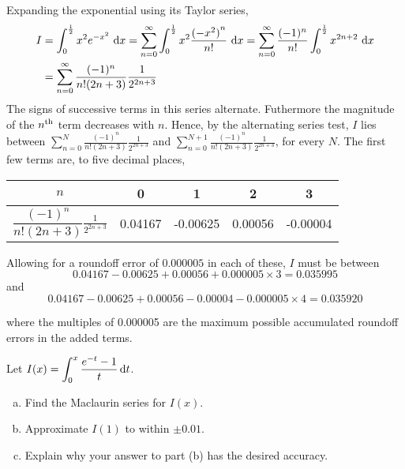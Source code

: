 \begin{solution}
Expanding the exponential using its Taylor series,
\begin{align*}
I&=\int_0^{\frac{1}{2}} x^2 e^{-x^2}\ \dee{x}
=\sum_{n=0}^\infty\int_0^{\frac{1}{2}} x^2 \frac{{(-x^2)}^n}{n!}\ \dee{x}
=\sum_{n=0}^\infty \frac{(-1)^n}{n!}\int_0^{\frac{1}{2}} x^{2n+2} \ \dee{x} \\
&=\sum_{n=0}^\infty \frac{(-1)^n}{n!(2n+3)}\frac{1}{2^{2n+3}}
\end{align*}
The signs of successive terms in this series alternate. Futhermore the
magnitude of the $n^{\rm th}$ term decreases with $n$. Hence, by the alternating
series test, $I$ lies between
$\sum\limits_{n=0}^N \frac{(-1)^n}{n!(2n+3)}\frac{1}{2^{2n+3}}$ and
$\sum\limits_{n=0}^{N+1} \frac{(-1)^n}{n!(2n+3)}\frac{1}{2^{2n+3}}$, for every
$N$. The first few terms are, to five decimal places,
\renewcommand{\arraystretch}{1.5}
\begin{center}
     \begin{tabular}{|c|c|c|c|c|}
          \hline
          $n$&0&1&2&3  \\
          \hline
          $\dfrac{(-1)^n}{n!(2n+3)}\frac{1}{2^{2n+3}}$&0.04167&-0.00625&0.00056&-0.00004\\
          \hline
     \end{tabular}
\end{center}
\renewcommand{\arraystretch}{1.0}
Allowing for a roundoff error of $0.000005$ in each of these,
$I$ must be between
\begin{equation*}
0.04167-0.00625+0.00056+0.000005\times 3=0.035995
\end{equation*}
and
\begin{equation*}
0.04167-0.00625+0.00056-0.00004-0.000005\times 4=0.035920
\end{equation*}

where the multiples of
 0.000005 are the maximum
possible accumulated roundoff errors in the added terms.
\end{solution}


\begin{question}[1996D]
 Let $\displaystyle I(x)=\int_0^x\frac{e^{-t}-1}{t}\,\mathrm{d}t$.
\begin{enumerate}[(a)]
\item
Find the Maclaurin series for $I(x)$.
\item
 Approximate $I(1)$ to within $\pm0.01$.
\item
Explain why your answer to part (b) has the desired accuracy.
\end{enumerate}
\end{question}

